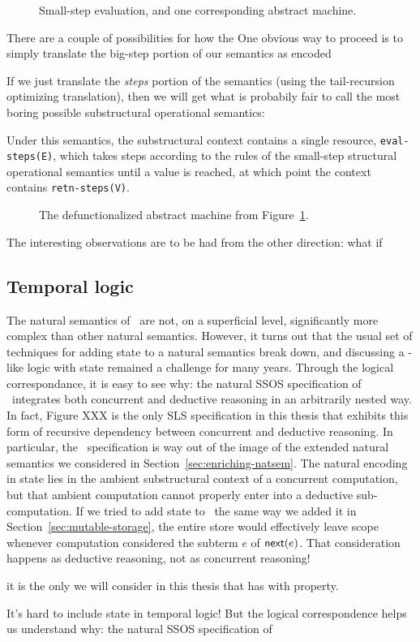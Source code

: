 \begin{figure}[tp]
\caption{Small-step evaluation, and one corresponding abstract machine.}
\label{fig:cbv-sos}
\end{figure}


There are a couple of possibilities for how the 
One obvious way to proceed is to simply translate the big-step portion
of our semantics as encoded 


If we just translate the {\it steps} portion of the semantics (using
the tail-recursion optimizing translation), then we will get what is
probabily fair to call the most boring possible substructural
operational semantics: 

\smallskip
{}
\smallskip

\noindent
Under this semantics, the substructural context contains a single
resource, \Verb|eval-steps(E)|, which takes steps according to the
rules of the small-step structural operational semantics until a value
is reached, at which point the context contains \Verb|retn-steps(V)|.


\begin{figure}[t]
\caption{The defunctionalized abstract machine from Figure~\ref{fig:cbv-sos}.}
\label{fig:cbv-sos-defun}
\end{figure}

The interesting observations are to be had from the other direction: what if

\subsection{Temporal logic}

The natural semantics of \rowan~are not, on a superficial level,
significantly more complex than other natural semantics. However, it
turns out that the usual set of techniques for adding state to a
natural semantics break down, and discussing a \rowan-like logic with
state remained a challenge for many years. Through the
logical correspondance, it is easy to see why: the natural SSOS
specification of \rowan~integrates both concurrent and deductive
reasoning in an arbitrarily nested way. In fact, Figure XXX is the
only SLS specification in this thesis that exhibits this form of
recursive dependency between concurrent and deductive reasoning.  In
particular, the \rowan~specification is way out of the image of the
extended natural semantics we considered in
Section~\ref{sec:enriching-natsem}. The natural encoding in state lies
in the ambient substructural context of a concurrent computation, but
that ambient computation cannot properly enter into a deductive
sub-computation. If we tried to add state to \rowan~the same way we
added it in Section~\ref{sec:mutable-storage}, the entire store
would effectively leave scope whenever computation considered
the subterm $e$ of ${\sf next}(e)$. That consideration happens
as deductive reasoning, not as concurrent reasoning!

 it is the only we
will consider in this thesis that has with property.

It's hard to include state in temporal logic! But the logical correspondence
helps us understand why: the natural SSOS specification of 